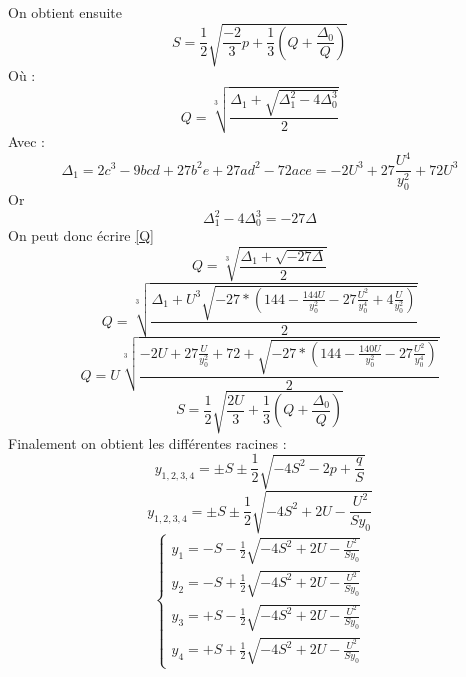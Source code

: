 \documentclass[12pt]{article}
\begin{document}
On obtient ensuite 
\begin{equation}
S = \frac{1}{2} \sqrt{\frac{-2}{3}p + \frac{1}{3}(Q + \frac{\Delta_0}{Q})}
\end{equation}
O\`u :
\begin{equation}
\label{Q}
Q = \sqrt[3]{\frac{\Delta_1 + \sqrt{\Delta_1^2 - 4 \Delta_0^3}}{2}}
\end{equation}
Avec :
\begin{equation}
 \Delta_1 = 2c^3 - 9bcd + 27b^2e + 27ad^2 - 72ace = -2U^3 + 27\frac{U^4}{y_0^2} + 72U^3 
\end{equation}
Or
\begin{equation}
 \Delta_1^2-4\Delta_0^3 = - 27\Delta
\end{equation}
On peut donc \'ecrire \ref{Q}
\begin{equation}
Q =  \sqrt[3]{\frac{\Delta_1+\sqrt{-27\Delta}}{2}}
\end{equation}
\begin{equation}
Q= \sqrt[3]{\frac{\Delta_1 + U^3\sqrt{-27 *(144 - \frac{144U}{y_0^2} - 27 \frac{U^2}{y_0^4} + 4 \frac{U}{y_0^2})}}{2}} 
\end{equation}
\begin{equation}
 Q= U\sqrt[3]{\frac{-2U + 27\frac{U}{y_0^2} + 72  + \sqrt{-27 *(144 - \frac{140U}{y_0^2} - 27 \frac{U^2}{y_0^4} )}}{2}} 
\end{equation}
\begin{equation}
 S = \frac{1}{2}\sqrt{\frac{2U}{3} + \frac{1}{3}(Q + \frac{\Delta_0}{Q}) }
\end{equation}
Finalement on obtient les diff\'erentes racines :
\begin{equation}
 y_{1,2,3,4} = \pm S \pm \frac{1}{2}\sqrt{-4S^2-2p+\frac{q}{S}}
\end{equation}
\begin{equation}
 y_{1,2,3,4} = \pm S \pm \frac{1}{2}\sqrt{-4S^2+2U-\frac{U^2}{Sy_0}}
\end{equation}
\begin{equation}
\left\{ \begin{array}{rl}
y_{1} = - S - \frac{1}{2}\sqrt{-4S^2+2U-\frac{U^2}{Sy_0}}\\
y_{2} = - S + \frac{1}{2}\sqrt{-4S^2+2U-\frac{U^2}{Sy_0}}\\
y_{3} = + S - \frac{1}{2}\sqrt{-4S^2+2U-\frac{U^2}{Sy_0}}\\
y_{4} = + S + \frac{1}{2}\sqrt{-4S^2+2U-\frac{U^2}{Sy_0}}
\end{array} \right.
\end{equation} 
\end{document}
